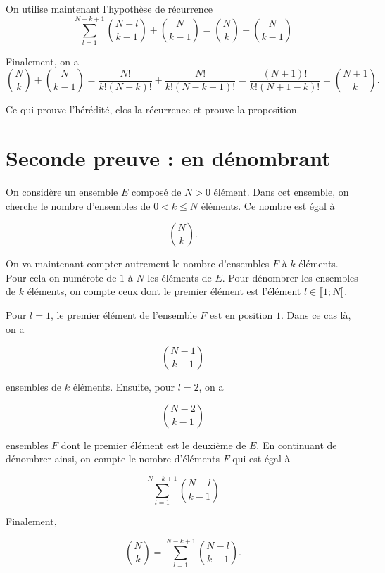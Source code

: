 \documentclass{article}
\begin{document}
On utilise maintenant l'hypothèse de récurrence
\begin{equation*}
\sum_{l=1}^{N-k+1} {N-l \choose k-1} + {N \choose k-1} = {N \choose k}+ {N \choose k-1}
\end{equation*}

Finalement, on a
\begin{equation*}
{N \choose k}+ {N \choose k-1}= \frac{N!}{k!(N-k)!} + \frac{N!}{k!(N-k+1)!} = \frac{(N+1)!}{k!(N+1-k)!} = {N+1 \choose k}.
\end{equation*}

Ce qui prouve l'hérédité, clos la récurrence et prouve la proposition.

\section{Seconde preuve :  en dénombrant}

On considère un ensemble $E$ composé de $N>0$ élément. Dans cet ensemble, on cherche le nombre d'ensembles de $0<k\leq N$ éléments. Ce nombre est égal à

\begin{equation*}
{N \choose k}.
\end{equation*}

On va maintenant compter autrement le nombre d'ensembles $F$ à $k$ éléments. Pour cela on numérote de $1$ à $N$ les éléments de $E$. Pour dénombrer les ensembles de $k$ éléments, on compte ceux dont le premier élément est l'élément $l \in  \llbracket 1;N \rrbracket$.

Pour $l=1$, le premier élément de l'ensemble $F$ est en position $1$. Dans ce cas là, on a 

\begin{equation*}
{N-1 \choose k-1}
\end{equation*}

ensembles de $k$ éléments. Ensuite, pour $l=2$, on a 

\begin{equation*}
{N-2 \choose k-1}
\end{equation*}

ensembles $F$ dont le premier élément est le deuxième de $E$. En continuant de dénombrer ainsi, on compte le nombre d'éléments $F$ qui est égal à

\begin{equation*}
\sum_{l=1}^{N-k+1} {N-l \choose k-1}
\end{equation*}

Finalement,

\begin{equation*}
{N \choose k} = \sum_{l=1}^{N-k+1} {N-l \choose k-1}.
\end{equation*}
\end{document}
